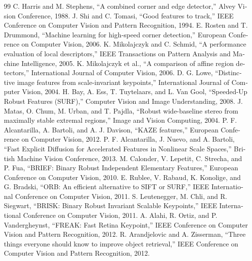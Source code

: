 \documentclass[12pt,openany,oneside]{book}
\begin{document}
\backmatter
\renewcommand{\bibname}{\rl{منابع منتخب فصل}}
\begin{latin}
\begin{thebibliography}{99}
 C. Harris and M. Stephens, ``A combined corner and edge detector,'' Alvey Vision Conference, 1988.
 J. Shi and C. Tomasi, ``Good features to track,'' IEEE Conference on Computer Vision and Pattern Recognition, 1994.
 E. Rosten and T. Drummond, ``Machine learning for high-speed corner detection,'' European Conference on Computer Vision, 2006.
 K. Mikolajczyk and C. Schmid, ``A performance evaluation of local descriptors,'' IEEE Transactions on Pattern Analysis and Machine Intelligence, 2005.
 K. Mikolajczyk et al., ``A comparison of affine region detectors,'' International Journal of Computer Vision, 2006.
 D. G. Lowe, ``Distinctive image features from scale-invariant keypoints,'' International Journal of Computer Vision, 2004.
 H. Bay, A. Ess, T. Tuytelaars, and L. Van Gool, ``Speeded-Up Robust Features (SURF),'' Computer Vision and Image Understanding, 2008.
 J. Matas, O. Chum, M. Urban, and T. Pajdla, ``Robust wide-baseline stereo from maximally stable extremal regions,'' Image and Vision Computing, 2004.
 P. F. Alcantarilla, A. Bartoli, and A. J. Davison, ``KAZE features,'' European Conference on Computer Vision, 2012.
 P. F. Alcantarilla, J. Nuevo, and A. Bartoli, ``Fast Explicit Diffusion for Accelerated Features in Nonlinear Scale Spaces,'' British Machine Vision Conference, 2013.
 M. Calonder, V. Lepetit, C. Strecha, and P. Fua, ``BRIEF: Binary Robust Independent Elementary Features,'' European Conference on Computer Vision, 2010.
 E. Rublee, V. Rabaud, K. Konolige, and G. Bradski, ``ORB: An efficient alternative to SIFT or SURF,'' IEEE International Conference on Computer Vision, 2011.
 S. Leutenegger, M. Chli, and R. Siegwart, ``BRISK: Binary Robust Invariant Scalable Keypoints,'' IEEE International Conference on Computer Vision, 2011.
 A. Alahi, R. Ortiz, and P. Vandergheynst, ``FREAK: Fast Retina Keypoint,'' IEEE Conference on Computer Vision and Pattern Recognition, 2012.
 R. Arandjelovic and A. Zisserman, ``Three things everyone should know to improve object retrieval,'' IEEE Conference on Computer Vision and Pattern Recognition, 2012.

\end{thebibliography}
\end{latin}
\end{document}
